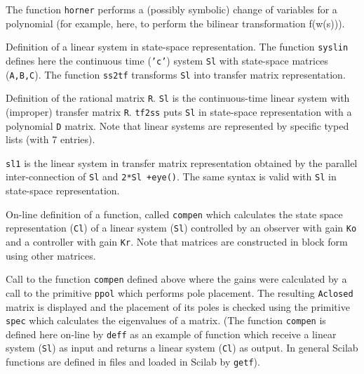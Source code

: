\noindent\dotfill



The function {\tt horner} performs a (possibly symbolic) change of 
variables for a polynomial (for example, here, to
perform the bilinear transformation f(w(s))).

\noindent\dotfill



Definition of a linear system in state-space representation.
The function {\tt syslin} defines here the continuous time ({\tt 'c'}) system
{\tt Sl} with state-space matrices ({\tt A,B,C}). The function
{\tt ss2tf} transforms {\tt Sl} into transfer matrix representation.

\noindent\dotfill



Definition of the rational matrix {\tt R}. {\tt Sl} is the
continuous-time linear system with (improper) transfer matrix
{\tt R}. {\tt tf2ss} puts {\tt Sl} in state-space representation with a
polynomial {\tt D} matrix. Note that linear systems are represented
by specific typed lists (with 7 entries).

\noindent\dotfill



{\tt sl1} is the linear system in transfer matrix representation
obtained by the parallel inter-connection of {\tt Sl} and {\tt 2*Sl +eye()}.
The same syntax is valid with {\tt Sl} in state-space representation.

\noindent\dotfill



On-line definition of a function, called {\tt compen} which calculates the 
state space representation
({\tt Cl}) of a linear system ({\tt Sl}) controlled by an observer
with gain {\tt Ko}
and a controller with gain {\tt Kr}.  Note that matrices are constructed
in block form using other matrices.

\noindent\dotfill



Call to the function {\tt compen} defined above where the gains were
calculated by a call to the primitive {\tt ppol} which performs pole
placement.
The resulting {\tt Aclosed} matrix is displayed and the placement
of its poles is checked using the primitive {\tt spec} which calculates
the eigenvalues of a matrix. (The function {\tt compen} is defined here
on-line by {\tt deff} as an example of function which receive a linear system 
({\tt Sl}) as input and returns a linear system ({\tt Cl}) as output.
In general Scilab functions are defined in files and loaded in Scilab
by {\tt getf}).

